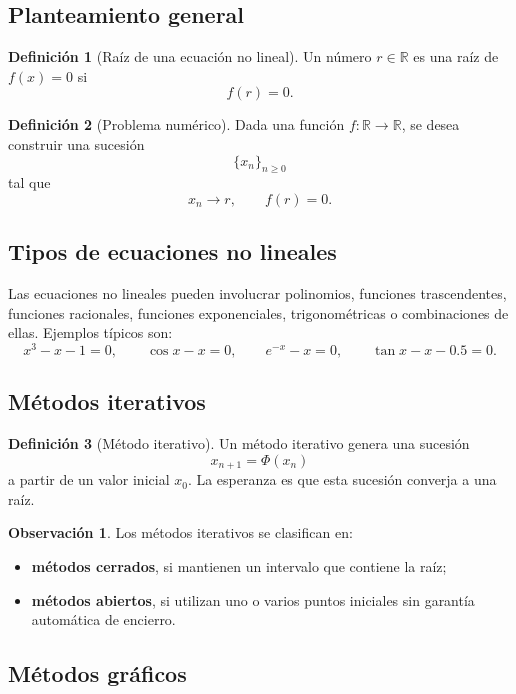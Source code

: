 \documentclass[a4paper,12pt]{article}
\newcommand{\R}{\mathbb{R}}
\theoremstyle{definition}
\newtheorem{definicion}{Definición}[section]
\newtheorem{observacion}{Observación}[section]
\theoremstyle{plain}
\begin{document}
\subsection{Planteamiento general}

\begin{definicion}[Raíz de una ecuación no lineal]
Un número $r\in\R$ es una raíz de $f(x)=0$ si
\[
f(r)=0.
\]
\end{definicion}

\begin{definicion}[Problema numérico]
Dada una función $f:\R\to\R$, se desea construir una sucesión
\[
\{x_n\}_{n\ge 0}
\]
tal que
\[
x_n \to r, \qquad f(r)=0.
\]
\end{definicion}

\subsection{Tipos de ecuaciones no lineales}

Las ecuaciones no lineales pueden involucrar polinomios, funciones
trascendentes, funciones racionales, funciones exponenciales, trigonométricas
o combinaciones de ellas. Ejemplos típicos son:
\[
x^3-x-1=0,\qquad \cos x - x =0,\qquad e^{-x}-x=0,\qquad
\tan x - x -0.5=0.
\]

\subsection{Métodos iterativos}

\begin{definicion}[Método iterativo]
Un método iterativo genera una sucesión
\[
x_{n+1}=\Phi(x_n)
\]
a partir de un valor inicial $x_0$. La esperanza es que esta sucesión converja
a una raíz.
\end{definicion}

\begin{observacion}
Los métodos iterativos se clasifican en:
\begin{itemize}[leftmargin=1.5em]
    \item \textbf{métodos cerrados}, si mantienen un intervalo que contiene la
          raíz;
    \item \textbf{métodos abiertos}, si utilizan uno o varios puntos iniciales
          sin garantía automática de encierro.
\end{itemize}
\end{observacion}

\subsection{Métodos gráficos}
\end{document}
